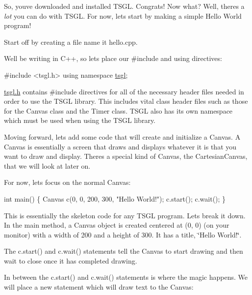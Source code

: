 So, you\textquotesingle{}ve downloaded and installed T\+S\+G\+L. Congrats! Now what? Well, there\textquotesingle{}s a {\itshape lot} you can do with T\+S\+G\+L. For now, let\textquotesingle{}s start by making a simple Hello World program!

Start off by creating a file name it hello.\+cpp.

We\textquotesingle{}ll be writing in C++, so let\textquotesingle{}s place our \#include and using directives\+:


\begin{DoxyCode}
\textcolor{preprocessor}{#include <tsgl.h>}
\textcolor{keyword}{using namespace }\hyperlink{namespacetsgl}{tsgl};
\end{DoxyCode}


\hyperlink{tsgl_8h_source}{tsgl.\+h} contains \#include directives for all of the necessary header files needed in order to use the T\+S\+G\+L library. This includes vital class header files such as those for the Canvas class and the Timer class. T\+S\+G\+L also has its own namespace which must be used when using the T\+S\+G\+L library.

Moving forward, let\textquotesingle{}s add some code that will create and initialize a Canvas. A Canvas is essentially a screen that draws and displays whatever it is that you want to draw and display. There\textquotesingle{}s a special kind of Canvas, the Cartesian\+Canvas, that we will look at later on.

For now, let\textquotesingle{}s focus on the normal Canvas\+:


\begin{DoxyCode}
\textcolor{keywordtype}{int} main() \{
  Canvas c(0, 0, 200, 300, \textcolor{stringliteral}{"Hello World!"});
  c.start();
  c.wait();
\}
\end{DoxyCode}


This is essentially the skeleton code for any T\+S\+G\+L program. Let\textquotesingle{}s break it down. In the main method, a Canvas object is created centered at (0, 0) (on your monitor) with a width of 200 and a height of 300. It has a title, \char`\"{}\+Hello World!\char`\"{}.

The c.\+start() and c.\+wait() statements tell the Canvas to start drawing and then wait to close once it has completed drawing.

In between the c.\+start() and c.\+wait() statements is where the magic happens. We will place a new statement which will draw text to the Canvas\+:



